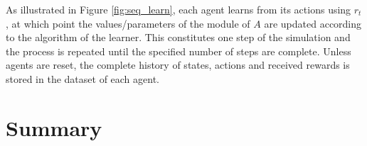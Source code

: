 

As illustrated in Figure \ref{fig:seq_learn}, each agent learns from its
actions using $r_t$, at which point the values/parameters of the module of $A$
are updated according to the algorithm of the learner. This constitutes one
step of the simulation and the process is repeated until the specified number
of steps are complete.  Unless agents are reset, the complete history of
states, actions and received rewards is stored in the dataset of each agent.

\section{Summary}
